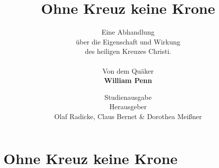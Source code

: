 \documentclass[pdftex,pagesize, 10pt]{scrbook}
\begin{document}
\thispagestyle{empty}

\null\newpage
\thispagestyle{empty}

\author{
Eine Abhandlung \\
über die Eigenschaft und Wirkung \\
des heiligen Kreuzes Christi.
\\
\\
Von dem Quäker
\\
\textbf{William Penn}
}

\title{Ohne Kreuz keine Krone}
\date{
\vspace{3cm}
Studienausgabe\\
\vfill
Herausgeber \\
Olaf Radicke, Claus Bernet \& Dorothea Meißner
}

\maketitle

\frontmatter

\tableofcontents



\mainmatter

 


\setcounter{secnumdepth}{-2}
\part{Ohne Kreuz keine Krone}

\end{document}
